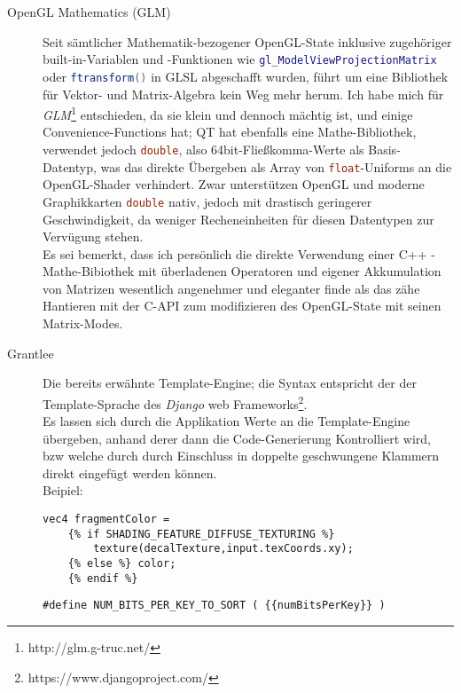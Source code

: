 \begin{description}
    	
    	\item[OpenGL Mathematics (GLM)]
    	Seit sämtlicher Mathematik-bezogener OpenGL-State inklusive zugehöriger built-in-Variablen und -Funktionen
    	wie \lstinline[language=GLSL]|gl_ModelViewProjectionMatrix| oder
    	\lstinline[language=GLSL]|ftransform()|
    	in GLSL abgeschafft wurden, führt um eine Bibliothek für Vektor- und Matrix-Algebra kein Weg mehr herum.
    	Ich habe mich für \emph{GLM}\footnote{http://glm.g-truc.net/} entschieden, da sie klein und dennoch mächtig ist,
    	und einige Convenience-Functions hat; QT hat ebenfalls eine Mathe-Bibliothek, verwendet jedoch
    	\lstinline[language=C]|double|, also 64bit-Fließkomma-Werte als Basis-Datentyp, was das direkte Übergeben
    	als Array von \lstinline[language=C]|float|-Uniforms an die OpenGL-Shader verhindert. Zwar unterstützen OpenGL
    	und moderne Graphikkarten \lstinline[language=C]|double| nativ, jedoch mit drastisch geringerer Geschwindigkeit,
    	da weniger Recheneinheiten für diesen Datentypen zur Vervügung stehen.\\
    	Es sei bemerkt, dass ich persönlich die direkte Verwendung einer C++ - Mathe-Bibiothek mit überladenen Operatoren
    	und eigener Akkumulation von Matrizen wesentlich angenehmer und eleganter finde als das zähe Hantieren
    	mit der C-API zum modifizieren des OpenGL-State mit seinen Matrix-Modes.
    	
    	\item[Grantlee]
	 		\lstset{language=GLSL} 
       		Die bereits erwähnte Template-Engine; die Syntax entspricht der der Template-Sprache des 
       		\emph{Django} web Frameworks\footnote{https://www.djangoproject.com/}.\\

       		Es lassen sich durch die Applikation Werte an die Template-Engine übergeben, anhand derer
       		dann die Code-Generierung Kontrolliert wird, bzw welche durch durch Einschluss in doppelte
       		geschwungene Klammern direkt eingefügt werden können. \\
       		Beipiel:
			\begin{lstlisting}      		
vec4 fragmentColor =  	
	{% if SHADING_FEATURE_DIFFUSE_TEXTURING %}  
		texture(decalTexture,input.texCoords.xy);
	{% else %} color;
	{% endif %}  
			\end{lstlisting} 
			\begin{lstlisting}
#define NUM_BITS_PER_KEY_TO_SORT ( {{numBitsPerKey}} )
			\end{lstlisting} 
     		

\end{description}
